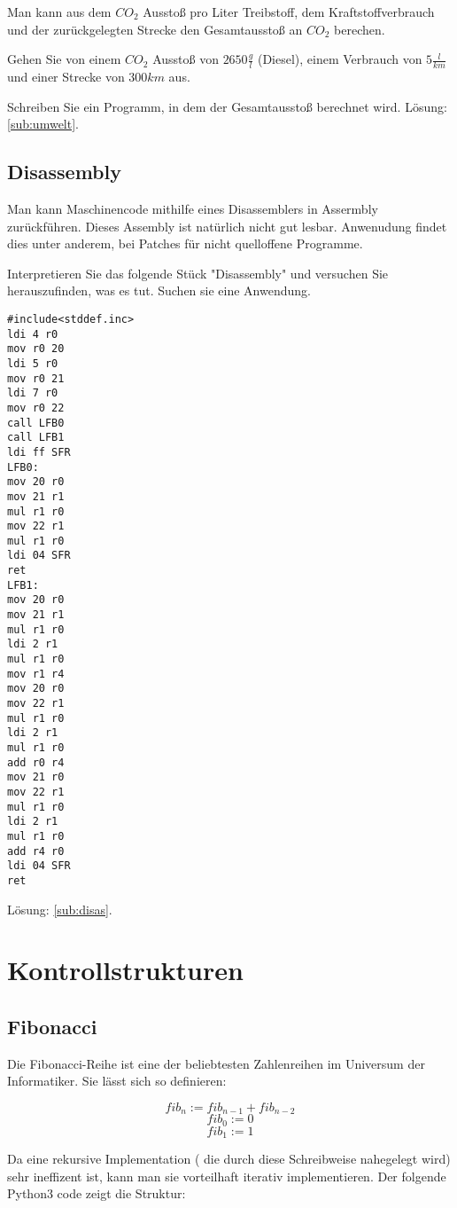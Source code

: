 \documentclass[a4paper,12pt,oneside]{scrreprt}
\begin{document}
Man kann aus dem $CO_2$ Ausstoß pro Liter Treibstoff, dem Kraftstoffverbrauch und der zurückgelegten Strecke den Gesamtausstoß an $CO_2$ berechen.

Gehen Sie von einem $CO_2$ Ausstoß von $ 2650 \frac{g}{l} $ (Diesel), einem Verbrauch von $ 5 \frac{l}{km} $ und einer Strecke von $ 300 km $ aus.

Schreiben Sie ein Programm, in dem der Gesamtausstoß berechnet wird.
Lösung: \ref{sub:umwelt}.

\subsection{Disassembly}

Man kann Maschinencode mithilfe eines Disassemblers in Assermbly zurückführen. Dieses Assembly ist natürlich nicht gut lesbar.
Anwenudung findet dies unter anderem, bei Patches für nicht quelloffene Programme.

Interpretieren Sie das folgende Stück "Disassembly" und versuchen Sie herauszufinden, was es tut. Suchen sie eine Anwendung.

\begin{lstlisting}
#include<stddef.inc>
ldi 4 r0
mov r0 20
ldi 5 r0
mov r0 21
ldi 7 r0
mov r0 22
call LFB0
call LFB1
ldi ff SFR
LFB0:
mov 20 r0
mov 21 r1
mul r1 r0
mov 22 r1
mul r1 r0
ldi 04 SFR
ret
LFB1:
mov 20 r0
mov 21 r1
mul r1 r0
ldi 2 r1
mul r1 r0
mov r1 r4
mov 20 r0
mov 22 r1
mul r1 r0
ldi 2 r1
mul r1 r0
add r0 r4
mov 21 r0
mov 22 r1
mul r1 r0
ldi 2 r1
mul r1 r0
add r4 r0
ldi 04 SFR
ret

\end{lstlisting}

Lösung: \ref{sub:disas}.

\section{Kontrollstrukturen}

\subsection{Fibonacci}

Die Fibonacci-Reihe ist eine der beliebtesten Zahlenreihen im Universum der Informatiker. Sie lässt sich so definieren:

$$ fib_n := fib_{n-1} + fib_{n-2} $$
$$ fib_0 := 0 $$
$$ fib_1 := 1 $$

Da eine rekursive Implementation ( die durch diese Schreibweise nahegelegt wird) sehr ineffizent ist, kann man sie vorteilhaft
iterativ implementieren. Der folgende Python3 code zeigt die Struktur:
\end{document}
